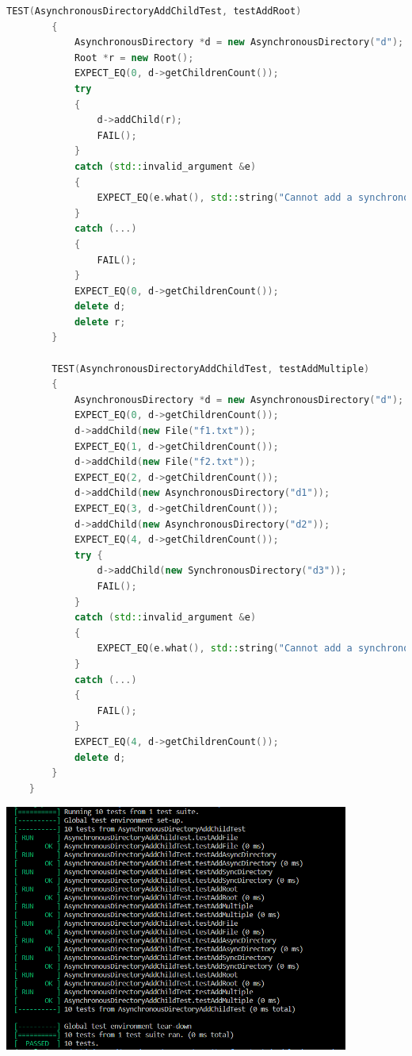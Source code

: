 \documentclass{article}
\begin{document}
\begin{lstlisting}[language=C++]
        TEST(AsynchronousDirectoryAddChildTest, testAddRoot)
        {
            AsynchronousDirectory *d = new AsynchronousDirectory("d");
            Root *r = new Root();
            EXPECT_EQ(0, d->getChildrenCount());
            try
            {
                d->addChild(r);
                FAIL();
            }
            catch (std::invalid_argument &e)
            {
                EXPECT_EQ(e.what(), std::string("Cannot add a synchronous node to an asynchronous directory"));
            }
            catch (...)
            {
                FAIL();
            }
            EXPECT_EQ(0, d->getChildrenCount());
            delete d;
            delete r;
        }

        TEST(AsynchronousDirectoryAddChildTest, testAddMultiple)
        {
            AsynchronousDirectory *d = new AsynchronousDirectory("d");
            EXPECT_EQ(0, d->getChildrenCount());
            d->addChild(new File("f1.txt"));
            EXPECT_EQ(1, d->getChildrenCount());
            d->addChild(new File("f2.txt"));
            EXPECT_EQ(2, d->getChildrenCount());
            d->addChild(new AsynchronousDirectory("d1"));
            EXPECT_EQ(3, d->getChildrenCount());
            d->addChild(new AsynchronousDirectory("d2"));
            EXPECT_EQ(4, d->getChildrenCount());
            try {
                d->addChild(new SynchronousDirectory("d3"));
                FAIL();
            }
            catch (std::invalid_argument &e)
            {
                EXPECT_EQ(e.what(), std::string("Cannot add a synchronous node to an asynchronous directory"));
            }
            catch (...)
            {
                FAIL();
            }
            EXPECT_EQ(4, d->getChildrenCount());
            delete d;
        }
    }
\end{lstlisting}
\includegraphics[width=0.85\textwidth]{Task7.png}
\end{document}
